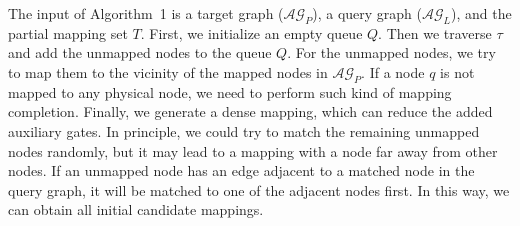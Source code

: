 \documentclass[journal]{IEEEtran}
\begin{document}
The input of Algorithm~1 %
 is a target graph ($\mathcal{AG}_{P}$), a query graph ($\mathcal{AG}_{L}$), and the partial mapping set $T$. First, we initialize an empty queue $Q$.
Then we traverse $\tau$ and add the unmapped nodes to the queue $Q$. For the unmapped nodes, we try to map them to the vicinity of the mapped nodes in $\mathcal{AG}_{P}$. If a node $\textit{q}$ is not mapped to any physical node, we need to perform such kind of mapping completion. Finally, we generate a dense mapping, which can reduce the added auxiliary gates. In principle, we could try to match the remaining unmapped nodes randomly, but it may lead to a mapping with a node far away from other nodes. If an unmapped node has an edge adjacent to a matched node in the query graph, it will be matched to one of the adjacent nodes first.  In this way, we can obtain all initial candidate mappings.
\end{document}
